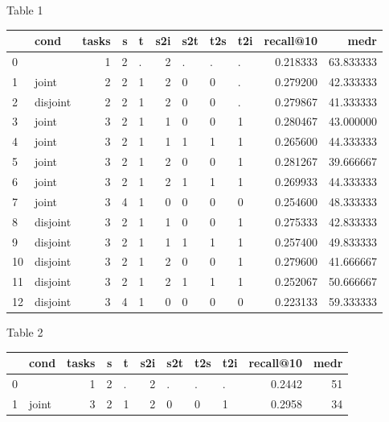 Table 1 \label{tab:core-results}
\begin{tabular}{llrrlrlllrr}
\toprule
{} &      cond &  tasks &  s &  t &  s2i & s2t & t2s & t2i &  recall@10 &       medr \\
\midrule
0  &           &      1 &  2 &  . &    2 &   . &   . &   . &   0.218333 &  63.833333 \\
1  &     joint &      2 &  2 &  1 &    2 &   0 &   0 &   . &   0.279200 &  42.333333 \\
2  &  disjoint &      2 &  2 &  1 &    2 &   0 &   0 &   . &   0.279867 &  41.333333 \\
3  &     joint &      3 &  2 &  1 &    1 &   0 &   0 &   1 &   0.280467 &  43.000000 \\
4  &     joint &      3 &  2 &  1 &    1 &   1 &   1 &   1 &   0.265600 &  44.333333 \\
5  &     joint &      3 &  2 &  1 &    2 &   0 &   0 &   1 &   0.281267 &  39.666667 \\
6  &     joint &      3 &  2 &  1 &    2 &   1 &   1 &   1 &   0.269933 &  44.333333 \\
7  &     joint &      3 &  4 &  1 &    0 &   0 &   0 &   0 &   0.254600 &  48.333333 \\
8  &  disjoint &      3 &  2 &  1 &    1 &   0 &   0 &   1 &   0.275333 &  42.833333 \\
9  &  disjoint &      3 &  2 &  1 &    1 &   1 &   1 &   1 &   0.257400 &  49.833333 \\
10 &  disjoint &      3 &  2 &  1 &    2 &   0 &   0 &   1 &   0.279600 &  41.666667 \\
11 &  disjoint &      3 &  2 &  1 &    2 &   1 &   1 &   1 &   0.252067 &  50.666667 \\
12 &  disjoint &      3 &  4 &  1 &    0 &   0 &   0 &   0 &   0.223133 &  59.333333 \\
\bottomrule
\end{tabular}

Table 2 \label{tab:core-results-test}
\begin{tabular}{llrrlrlllrr}
\toprule
{} &   cond &  tasks &  s &  t &  s2i & s2t & t2s & t2i &  recall@10 &  medr \\
\midrule
0 &        &      1 &  2 &  . &    2 &   . &   . &   . &     0.2442 &    51 \\
1 &  joint &      3 &  2 &  1 &    2 &   0 &   0 &   1 &     0.2958 &    34 \\
\bottomrule
\end{tabular}

